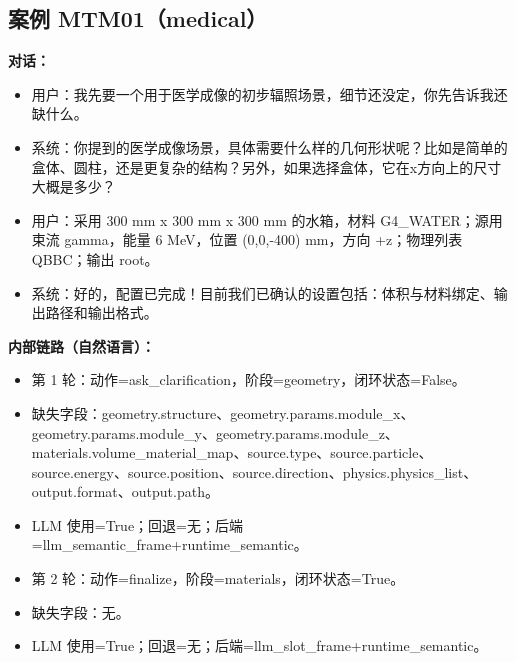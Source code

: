 \documentclass[11pt]{ctexart}
\begin{document}
\subsection{案例 MTM01（medical）}
\textbf{对话：}
\begin{itemize}
\item 用户：我先要一个用于医学成像的初步辐照场景，细节还没定，你先告诉我还缺什么。
\item 系统：你提到的医学成像场景，具体需要什么样的几何形状呢？比如是简单的盒体、圆柱，还是更复杂的结构？另外，如果选择盒体，它在x方向上的尺寸大概是多少？
\item 用户：采用 300 mm x 300 mm x 300 mm 的水箱，材料 G4\_WATER；源用束流 gamma，能量 6 MeV，位置 (0,0,-400) mm，方向 +z；物理列表 QBBC；输出 root。
\item 系统：好的，配置已完成！目前我们已确认的设置包括：体积与材料绑定、输出路径和输出格式。
\end{itemize}
\textbf{内部链路（自然语言）：}
\begin{itemize}
\item 第 1 轮：动作=ask\_clarification，阶段=geometry，闭环状态=False。
\item 缺失字段：geometry.structure、geometry.params.module\_x、geometry.params.module\_y、geometry.params.module\_z、materials.volume\_material\_map、source.type、source.particle、source.energy、source.position、source.direction、physics.physics\_list、output.format、output.path。
\item LLM 使用=True；回退=无；后端=llm\_semantic\_frame+runtime\_semantic。
\item 第 2 轮：动作=finalize，阶段=materials，闭环状态=True。
\item 缺失字段：无。
\item LLM 使用=True；回退=无；后端=llm\_slot\_frame+runtime\_semantic。
\end{itemize}
\end{document}

